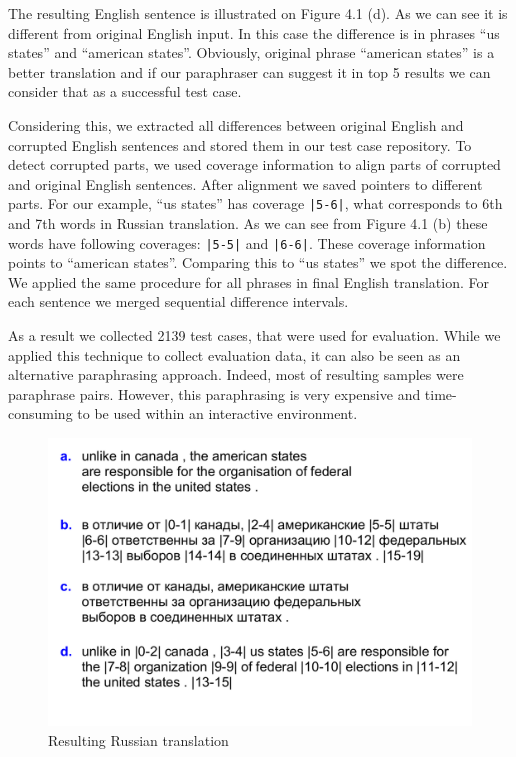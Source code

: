The resulting English sentence is illustrated on Figure 4.1 (d). As we can see it is different from original English input. In this case the difference is in phrases ``us states'' and ``american states''. Obviously, original phrase ``american states'' is a better translation and if our paraphraser can suggest it in top 5 results we can consider that as a successful test case. 

Considering this, we extracted all differences between original English and corrupted English sentences and stored them in our test case repository. To detect corrupted parts, we used coverage information to align parts of corrupted and original English sentences. After alignment we saved pointers to different parts. For our example, ``us states'' has coverage \texttt{|5-6|}, what corresponds to 6th and 7th words in Russian translation. As we can see from Figure 4.1 (b) these words have following coverages: \texttt{|5-5|} and \texttt{|6-6|}. These coverage information points to ``american states''. Comparing this to ``us states'' we spot the difference. We applied the same procedure for all phrases in final English translation. For each sentence we merged sequential difference intervals.

As a result we collected 2139 test cases, that were used for evaluation. While we applied this technique to collect evaluation data, it can also be seen as an alternative paraphrasing approach. Indeed, most of resulting samples were paraphrase pairs. However, this paraphrasing is very expensive and time-consuming to be used within an interactive environment. 

\begin{figure}
 \centering 
 \includegraphics[scale=0.75]{g/rus-sample1.pdf}
 \caption{Resulting Russian translation}
\end{figure}

